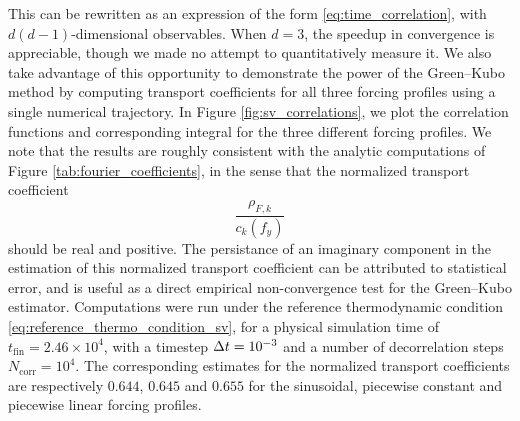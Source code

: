 This can be rewritten as an expression of the form \eqref{eq:time_correlation}, with $d(d-1)$-dimensional observables. 
When $d=3$, the speedup in convergence is appreciable, though we made no attempt to quantitatively measure it.
We also take advantage of this opportunity to demonstrate the power of the Green--Kubo method by computing transport coefficients for all three forcing profiles using a single numerical trajectory.
In Figure \eqref{fig:sv_correlations}, we plot the correlation functions and corresponding integral for the three different forcing profiles.
We note that the results are roughly consistent with the analytic computations of Figure \ref{tab:fourier_coefficients}, in the sense that the normalized transport coefficient 
\[\frac{\rho_{F,k}}{c_k(f_y)}\]
should be real and positive. 
The persistance of an imaginary component in the estimation of this normalized transport coefficient can be attributed to statistical error, and is useful as a direct empirical non-convergence test for the Green--Kubo estimator.
Computations were run under the reference thermodynamic condition \eqref{eq:reference_thermo_condition_sv}, for a physical simulation time of $t_{\mathrm{fin}}=2.46\times 10^4$, with a timestep ${\Delta t}=10^{-3}$ and a number of decorrelation steps $N_{\mathrm{corr}}=10^4$.
The corresponding estimates for the normalized transport coefficients are respectively $0.644$, $0.645$ and $0.655$ for the sinusoidal, piecewise constant and piecewise linear forcing profiles.

